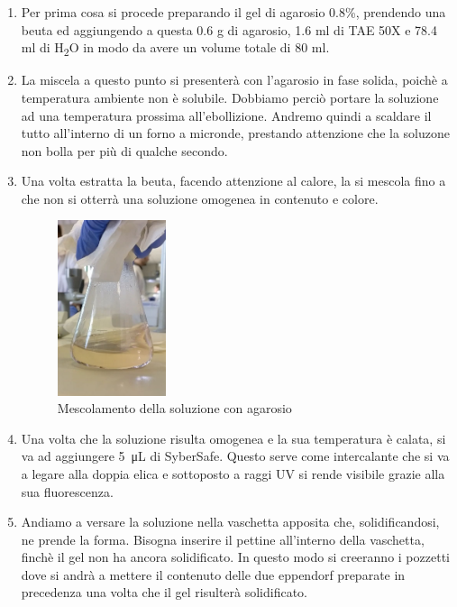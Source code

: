 \begin{enumerate}

	\item Per prima cosa si procede preparando il gel di agarosio 0.8\%, prendendo una beuta
	ed aggiungendo a questa 0.6 g di agarosio, 1.6 ml di TAE 50X e 78.4 ml di H\textsubscript{2}O
	in modo da avere un volume totale di 80 ml.

	\item La miscela a questo punto si presenterà con l'agarosio in fase solida,
	poichè a temperatura ambiente non è solubile.
	Dobbiamo perciò portare la soluzione ad una temperatura prossima all'ebollizione.
	Andremo quindi a scaldare il tutto all'interno di un forno a micronde, prestando attenzione
	che la soluzone non bolla per più di qualche secondo.

	\item Una volta estratta la beuta, facendo attenzione al calore,
	la si mescola fino a che non si otterrà una soluzione omogenea in contenuto e colore.

	\begin{figure}[H]
		\centering
		\includegraphics[width=0.3\textwidth]{./immagini/agarosio.jpg}
		\caption{Mescolamento della soluzione con agarosio}
		\label{agarosio}

	\end{figure}

	\item Una volta che la soluzione risulta omogenea e la sua temperatura \`e calata,
	si va ad aggiungere \SI{5}{\micro\liter} di SyberSafe.
	Questo serve come intercalante che si va a legare alla doppia elica
	e sottoposto a raggi UV si rende visibile grazie alla sua fluorescenza.

	\item Andiamo a versare la soluzione nella vaschetta apposita che,
	solidificandosi, ne prende la forma.
	Bisogna inserire il pettine all'interno della vaschetta,
	finch\`e il gel non ha ancora solidificato.
	In questo modo si creeranno i pozzetti dove si andrà a mettere il contenuto delle
	due eppendorf preparate in precedenza una volta che il gel risulter\`a solidificato.


\end{enumerate}

